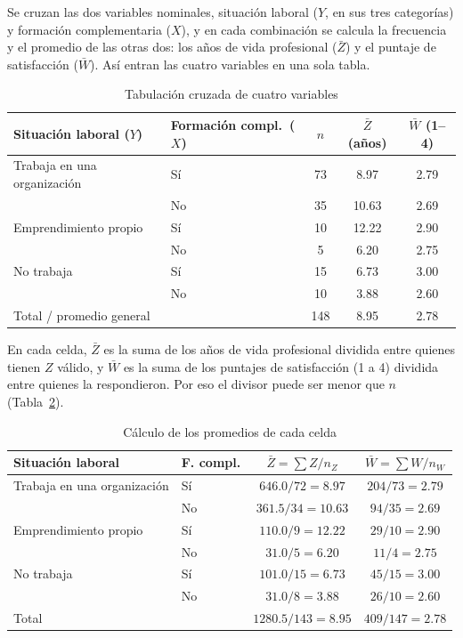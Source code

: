\documentclass[12pt, a4paper]{article}
\newenvironment{mitabla}[2][H]{%
  \begin{table}[#1]
  \centering
  \caption{#2}
  \small
}{%
  \end{table}
}
\begin{document}
Se cruzan las dos variables nominales, situación laboral ($Y$, en sus
tres categorías) y formación complementaria ($X$), y en cada combinación
se calcula la frecuencia y el promedio de las otras dos: los años de vida
profesional ($\bar{Z}$) y el puntaje de satisfacción ($\bar{W}$). Así
entran las cuatro variables en una sola tabla.

\begin{mitabla}{Tabulación cruzada de cuatro variables}\label{tab:real-multi}
\begin{tabular}{llccc}
\toprule
\textbf{Situación laboral ($Y$)} & \textbf{Formación compl.\ ($X$)} & \textbf{$n$} & \textbf{$\bar{Z}$ (años)} & \textbf{$\bar{W}$ (1--4)} \\
\midrule
Trabaja en una organización & Sí & 73 & 8.97  & 2.79 \\
                            & No & 35 & 10.63 & 2.69 \\
Emprendimiento propio       & Sí & 10 & 12.22 & 2.90 \\
                            & No & 5  & 6.20  & 2.75 \\
No trabaja                  & Sí & 15 & 6.73  & 3.00 \\
                            & No & 10 & 3.88  & 2.60 \\
\midrule
\multicolumn{2}{l}{Total / promedio general} & 148 & 8.95 & 2.78 \\
\bottomrule
\end{tabular}
\end{mitabla}

En cada celda, $\bar{Z}$ es la suma de los años de vida profesional
dividida entre quienes tienen $Z$ válido, y $\bar{W}$ es la suma de los
puntajes de satisfacción (1 a 4) dividida entre quienes la respondieron.
Por eso el divisor puede ser menor que $n$ (Tabla~\ref{tab:real-multi-calculo}).

\begin{mitabla}{Cálculo de los promedios de cada celda}\label{tab:real-multi-calculo}
\begin{tabular}{llcc}
\toprule
\textbf{Situación laboral} & \textbf{F. compl.} & \textbf{$\bar{Z} = \sum Z / n_Z$} & \textbf{$\bar{W} = \sum W / n_W$} \\
\midrule
Trabaja en una organización & Sí & $646.0/72 = 8.97$  & $204/73 = 2.79$ \\
                            & No & $361.5/34 = 10.63$ & $94/35 = 2.69$ \\
Emprendimiento propio       & Sí & $110.0/9 = 12.22$  & $29/10 = 2.90$ \\
                            & No & $31.0/5 = 6.20$    & $11/4 = 2.75$ \\
No trabaja                  & Sí & $101.0/15 = 6.73$  & $45/15 = 3.00$ \\
                            & No & $31.0/8 = 3.88$    & $26/10 = 2.60$ \\
\midrule
\multicolumn{2}{l}{Total} & $1280.5/143 = 8.95$ & $409/147 = 2.78$ \\
\bottomrule
\end{tabular}
\end{mitabla}
\end{document}
